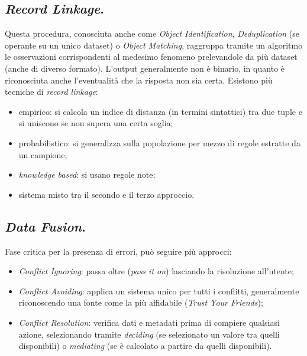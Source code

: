\documentclass[a4page, 11pt]{article}
\begin{document}
\subsection{\textit{Record Linkage}.}
Questa procedura, conosciuta anche come \textit{Object Identification}, \textit{Deduplication} (se operante su un unico dataset) o \textit{Object Matching}, raggruppa tramite un algoritmo le osservazioni corrispondenti al medesimo fenomeno prelevandole da più dataset (anche di diverso formato).
L'output generalmente non è binario, in quanto è riconosciuta anche l'eventualità che la risposta non sia certa.
Esistono più tecniche di \textit{record linkage}:
\begin{itemize}
\item empirico: si calcola un indice di distanza (in termini sintattici) tra due tuple e si uniscono se non supera una certa soglia;
\item probabilistico: si generalizza sulla popolazione per mezzo di regole estratte da un campione;
\item \textit{knowledge based}: si usano regole note;
\item sistema misto tra il secondo e il terzo approccio.
\end{itemize}


\subsection{\textit{Data Fusion}.}
Fase critica per la presenza di errori, può seguire più approcci:
\begin{itemize}
\item \textit{Conflict Ignoring}: passa oltre (\textit{pass it on}) lasciando la risoluzione all'utente;
\item \textit{Conflict Avoiding}: applica un sistema unico per tutti i conflitti, generalmente riconoscendo una fonte come la più affidabile (\textit{Trust Your Friends});
  \item \textit{Conflict Resolution}: verifica dati e metadati prima di compiere qualsiasi azione, selezionando tramite \textit{deciding} (se selezionato un valore tra quelli disponibili) o \textit{mediating} (se è calcolato a partire da quelli disponibili).
\end{itemize}



\end{document}
